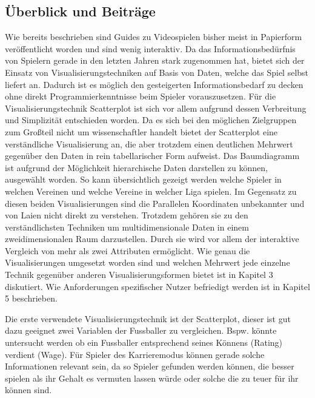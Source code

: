 \documentclass[usegeometry=true]{scrartcl}
\begin{document}
\subsection{Überblick und Beiträge}

Wie bereits beschrieben sind Guides zu Videospielen bisher meist in Papierform veröffentlicht worden und sind wenig interaktiv. Da das Informationsbedürfnis von Spielern gerade in den letzten Jahren stark zugenommen hat, bietet sich der Einsatz von Visualisierungstechniken auf Basis von Daten, welche das Spiel selbst liefert an. Dadurch ist es möglich den gesteigerten Informationsbedarf zu decken ohne direkt Programmierkenntnisse beim Spieler vorauszusetzen.
Für die Visualisierungstechnik Scatterplot ist sich vor allem aufgrund dessen Verbreitung und Simplizität entschieden worden. Da es sich bei den möglichen Zielgruppen zum Großteil nicht um wissenschaftler handelt bietet der Scatterplot eine verständliche Visualisierung an, die aber trotzdem einen deutlichen Mehrwert gegenüber den Daten in rein tabellarischer Form aufweist.
Das Baumdiagramm ist aufgrund der Möglichkeit hierarchische Daten darstellen zu können, ausgewählt worden. So kann übersichtlich gezeigt werden welche Spieler in welchen Vereinen und welche Vereine in welcher Liga spielen.
Im Gegensatz zu diesen beiden Visualisierungen sind die Parallelen Koordinaten unbekannter und von Laien nicht direkt zu verstehen. Trotzdem gehören sie zu den verständlichsten Techniken um multidimensionale Daten in einem zweidimensionalen Raum darzustellen. Durch sie wird vor allem der interaktive Vergleich von mehr als zwei Attributen ermöglicht. 
Wie genau die Visualisierungen umgesetzt worden sind und welchen Mehrwert jede einzelne Technik gegenüber anderen Visualisierungsformen bietet ist in Kapitel 3 diskutiert. Wie Anforderungen spezifischer Nutzer befriedigt werden ist in Kapitel 5 beschrieben.

\iffalse



Die erste verwendete Visualisierungstechnik ist der Scatterplot, dieser ist gut dazu geeignet zwei Variablen der Fussballer zu vergleichen. Bspw. könnte untersucht werden ob ein Fussballer entsprechend seines Könnens (Rating) verdient (Wage). Für Spieler des Karrieremodus können gerade solche Informationen relevant sein, da so Spieler gefunden werden können, die besser spielen als ihr Gehalt es vermuten lassen würde oder solche die zu teuer für ihr können sind.\\
\end{document}
